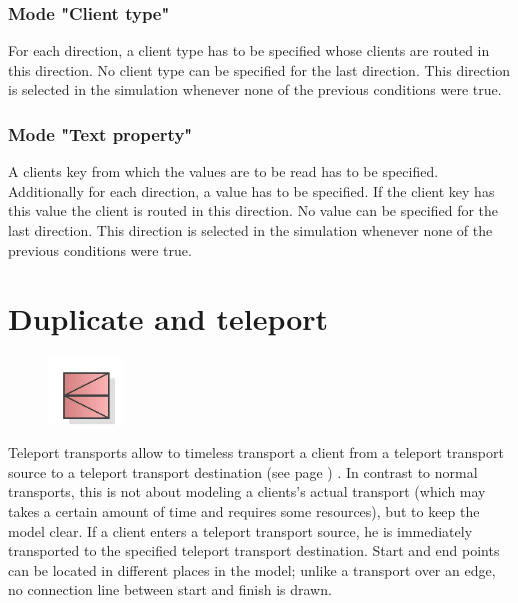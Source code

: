 \subsubsection*{Mode "Client type"}

For each direction, a client type has to be specified whose clients are routed in this direction.
No client type can be specified for the last direction. This direction is selected in the simulation
whenever none of the previous conditions were true.

\subsubsection*{Mode "Text property"}

A clients key from which the values are to be read has to be specified.
Additionally for each direction, a value has to be specified. If the client key has this value the client
is routed in this direction. No value can be specified for the last direction. This direction is selected in the simulation
whenever none of the previous conditions were true.


\section{Duplicate and teleport}
\label{ref:ModelElementTeleportSourceMulti}

\begin{figure}
\vspace{-22pt}
\includegraphics[width=2cm]{imageModelElementTeleportSourceMulti.png}
\vspace{-22pt}
\end{figure}

Teleport transports allow to timeless transport a client from a teleport transport source
to a teleport transport destination (see page \pageref{ref:ModelElementTeleportDestination}) .
In contrast to normal transports, this is not about modeling a clients's actual transport
(which may takes a certain amount of time and requires some resources), but to keep the model clear.
If a client enters a teleport transport source, he is immediately transported to the specified
teleport transport destination. Start and end points can be located in different places in the model;
unlike a transport over an edge, no connection line between start and finish is drawn.

